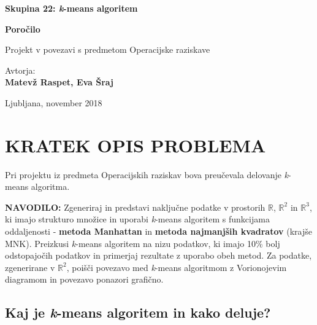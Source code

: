 \documentclass[11pt, a4paper]{article}
\begin{document}
\begin{titlepage}

\begin{center}

\Huge 
\textbf{Skupina 22: \textsl{k}-means algoritem}

\vspace{1cm}
\Large
\textbf{Poročilo}

\vspace{1cm}
\large
Projekt v povezavi s predmetom Operacijske raziskave

\vspace{2,5cm}
\large
Avtorja:\\
\textbf{Matevž Raspet, Eva Šraj}\\

\vfill

\Large Ljubljana, november 2018

\end{center}
\end{titlepage}

\tableofcontents

\vspace{1 cm}

\listoffigures

\pagebreak

\section{KRATEK OPIS PROBLEMA}
\noindent Pri projektu iz predmeta Operacijskih raziskav bova preučevala delovanje \textsl{k}-means algoritma. 

\vspace{0,5cm}

\noindent \textbf{NAVODILO:} Zgeneriraj in predstavi naključne podatke v prostorih $\mathbb{R}$, $\mathbb{R}^2$ in $\mathbb{R}^3$, ki imajo strukturo množice in uporabi \textsl{k}-means algoritem s funkcijama oddaljenosti - \textbf{metoda Manhattan} in \textbf{metoda najmanjših kvadratov} (krajše MNK).
Preizkusi \textsl{k}-means algoritem na nizu podatkov, ki imajo 10\% bolj odstopajočih podatkov in primerjaj rezultate z uporabo obeh metod.
Za podatke, zgenerirane v  $\mathbb{R}^2$, poišči povezavo med \textsl{k}-means algoritmom z Vorionojevim diagramom in povezavo ponazori grafično. 

\subsection{Kaj je \textsl{k}-means algoritem in kako deluje?}
\end{document}
